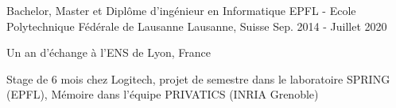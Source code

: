 


\begin{cventries}
	
\cventry
{Bachelor, Master et Diplôme d'ingénieur en Informatique} %
{EPFL - Ecole Polytechnique Fédérale de Lausanne} %
{Lausanne, Suisse} %
{Sep. 2014 - Juillet 2020} %
{ %
	\begin{cvitems}
		\item {Un an d'échange à l'ENS de Lyon, France}
		\item {Stage de 6 mois chez Logitech, projet de semestre dans le laboratoire SPRING (EPFL), Mémoire dans l'équipe PRIVATICS (INRIA Grenoble)}
	\end{cvitems}
}




\end{cventries}